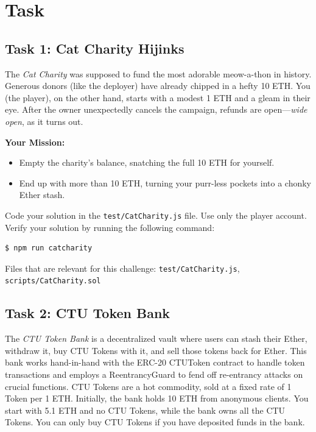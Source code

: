 \documentclass[12pt]{article}
\begin{document}
\section{Task}

\subsection*{Task 1: Cat Charity Hijinks}

The \emph{Cat Charity} was supposed to fund the most adorable meow-a-thon in history. Generous donors (like the deployer) have already chipped in a hefty 10 ETH. You (the player), on the other hand, starts with a modest 1 ETH and a gleam in their eye. After the owner unexpectedly cancels the campaign, refunds are open—\emph{wide open}, as it turns out. 

\medskip
\noindent
\textbf{Your Mission:}
\begin{itemize}
    \item Empty the charity's balance, snatching the full 10 ETH for yourself.
    \item End up with more than 10 ETH, turning your purr-less pockets into a chonky Ether stash.
\end{itemize}

\noindent
Code your solution in the \texttt{test/CatCharity.js} file. Use only the player account. Verify your solution by running the following command:

\begin{verbatim}
$ npm run catcharity
\end{verbatim}

\noindent
Files that are relevant for this challenge: \texttt{test/CatCharity.js}, \texttt{scripts/CatCharity.sol}

\subsection*{Task 2: CTU Token Bank}

The \emph{CTU Token Bank} is a decentralized vault where users can stash their Ether, withdraw it, buy CTU Tokens with it, and sell those tokens back for Ether. This bank works hand-in-hand with the ERC-20 CTUToken contract to handle token transactions and employs a ReentrancyGuard to fend off re-entrancy attacks on crucial functions. CTU Tokens are a hot commodity, sold at a fixed rate of 1 Token per 1 ETH. Initially, the bank holds 10 ETH from anonymous clients. You start with 5.1 ETH and no CTU Tokens, while the bank owns all the CTU Tokens. You can only buy CTU Tokens if you have deposited funds in the bank.
\end{document}
